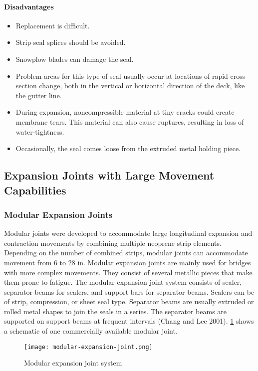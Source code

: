\paragraph*{Disadvantages}
\begin{itemize}
  \item Replacement is difficult.
  \item Strip seal splices should be avoided.
  \item Snowplow blades can damage the seal.
  \item Problem areas for this type of seal usually occur at locations of rapid cross section change, both in the vertical or horizontal direction of the deck, like the gutter line.
  \item During expansion, noncompressible material at tiny cracks could create membrane tears. This material can also cause ruptures, resulting in loss of water-tightness.
  \item Occasionally, the seal comes loose from the extruded metal holding piece.
\end{itemize}

\subsection{Expansion Joints with Large Movement Capabilities}
\subsubsection{Modular Expansion Joints}
Modular joints were developed to accommodate large longitudinal expansion and contraction movements by
combining multiple neoprene strip elements. Depending on the number of combined strips, modular joints can
accommodate movement from 6 to 28 in. Modular expansion joints are mainly used for bridges with more complex
movements. They consist of several metallic pieces that make them prone to fatigue. The modular expansion joint
system consists of sealer, separator beams for sealers, and support bars for separator beams. Sealers can be of strip,
compression, or sheet seal type. Separator beams are usually extruded or rolled metal shapes to join the seals in a
series. The separator beams are supported on support beams at frequent intervals (Chang and Lee 2001). \cref{fig:modular-expansion-joint}
shows a schematic of one commercially available modular joint.

\begin{figure}
  \texttt{[image: modular-expansion-joint.png]}
  \caption{Modular expansion joint system}
  \label{fig:modular-expansion-joint}
\end{figure}

